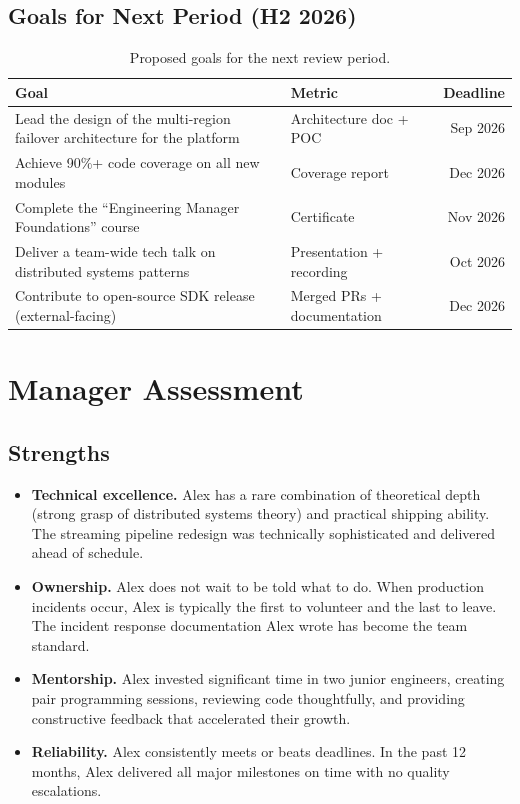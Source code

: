 \documentclass[
    language=english,
    doctype=performance-review,
    institution=none,
]{../../omnilatex}
\begin{document}
\subsection{Goals for Next Period (H2 2026)}

\begin{table}[h]
    \centering
    \begin{tabular}{p{5.5cm}lr}
        \toprule
        \textbf{Goal} & \textbf{Metric} & \textbf{Deadline} \\
        \midrule
        Lead the design of the multi-region failover architecture for
            the platform &
            Architecture doc + POC & Sep 2026 \\
        Achieve 90\%+ code coverage on all new modules &
            Coverage report & Dec 2026 \\
        Complete the ``Engineering Manager Foundations'' course &
            Certificate & Nov 2026 \\
        Deliver a team-wide tech talk on distributed systems patterns &
            Presentation + recording & Oct 2026 \\
        Contribute to open-source SDK release (external-facing) &
            Merged PRs + documentation & Dec 2026 \\
        \bottomrule
    \end{tabular}
    \caption{Proposed goals for the next review period.}
\end{table}

\section{Manager Assessment}

\subsection{Strengths}

\begin{itemize}
    \item \textbf{Technical excellence.} Alex has a rare combination of
        theoretical depth (strong grasp of distributed systems theory) and
        practical shipping ability. The streaming pipeline redesign was
        technically sophisticated and delivered ahead of schedule.
    \item \textbf{Ownership.} Alex does not wait to be told what to do. When
        production incidents occur, Alex is typically the first to volunteer
        and the last to leave. The incident response documentation Alex
        wrote has become the team standard.
    \item \textbf{Mentorship.} Alex invested significant time in two junior
        engineers, creating pair programming sessions, reviewing code
        thoughtfully, and providing constructive feedback that accelerated
        their growth.
    \item \textbf{Reliability.} Alex consistently meets or beats deadlines.
        In the past 12 months, Alex delivered all major milestones on time
        with no quality escalations.
\end{itemize}
\end{document}
